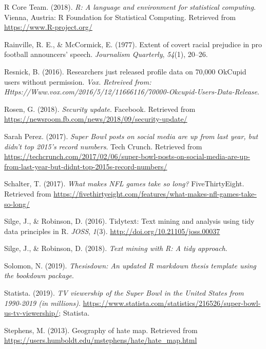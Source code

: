 \documentclass[12pt,twoside]{reedthesis}
\begin{document}
\hypertarget{ref-basepackage}{}
R Core Team. (2018). \emph{R: A language and environment for statistical
computing}. Vienna, Austria: R Foundation for Statistical Computing.
Retrieved from \url{https://www.R-project.org/}

\hypertarget{ref-rainville1977extent}{}
Rainville, R. E., \& McCormick, E. (1977). Extent of covert racial
prejudice in pro football announcers' speech. \emph{Journalism
Quarterly}, \emph{54}(1), 20--26.

\hypertarget{ref-resnick2016researchers}{}
Resnick, B. (2016). Researchers just released profile data on 70,000
OkCupid users without permission. \emph{Vox. Retreived from:
Https://Www.vox.com/2016/5/12/11666116/70000-Okcupid-Users-Data-Release}.

\hypertarget{ref-facebookbreach}{}
Rosen, G. (2018). \emph{Security update}. Facebook. Retrieved from
\url{https://newsroom.fb.com/news/2018/09/security-update/}

\hypertarget{ref-superbowl2017tweets}{}
Sarah Perez. (2017). \emph{Super Bowl posts on social media are up from
last year, but didn't top 2015's record numbers}. Tech Crunch. Retrieved
from
\url{https://techcrunch.com/2017/02/06/super-bowl-posts-on-social-media-are-up-from-last-year-but-didnt-top-2015s-record-numbers/}

\hypertarget{ref-gametime2016}{}
Schalter, T. (2017). \emph{What makes NFL games take so long?}
FiveThirtyEight. Retrieved from
\url{https://fivethirtyeight.com/features/what-makes-nfl-games-take-so-long/}

\hypertarget{ref-tidytext}{}
Silge, J., \& Robinson, D. (2016). Tidytext: Text mining and analysis
using tidy data principles in R. \emph{JOSS}, \emph{1}(3).
\url{http://doi.org/10.21105/joss.00037}

\hypertarget{ref-textmining}{}
Silge, J., \& Robinson, D. (2018). \emph{Text mining with R: A tidy
approach}.

\hypertarget{ref-solomon2019thesisdown}{}
Solomon, N. (2019). \emph{Thesisdown: An updated R markdown thesis
template using the bookdown package}.

\hypertarget{ref-superbowl2018}{}
Statista. (2019). \emph{TV viewership of the Super Bowl in the United
States from 1990-2019 (in millions)}.
\url{https://www.statista.com/statistics/216526/super-bowl-us-tv-viewership/};
Statista.

\hypertarget{ref-stephens2013geography}{}
Stephens, M. (2013). Geography of hate map. Retrieved from
\url{https://users.humboldt.edu/mstephens/hate/hate_map.html}
\end{document}

